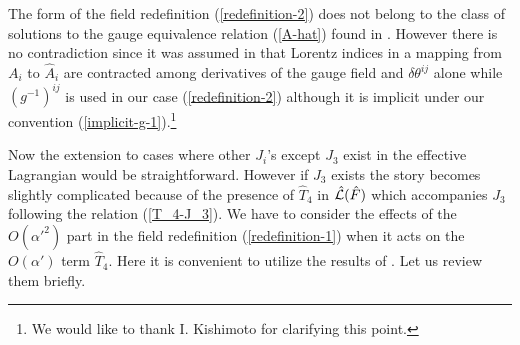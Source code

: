\documentclass[a4paper,12pt]{article}
\begin{document}
The form of the field redefinition (\ref{redefinition-2})
does not belong to the class of solutions
to the gauge equivalence relation
(\ref{A-hat}) found in \cite{AK}.
However there is no contradiction
since it was assumed in \cite{AK} that
Lorentz indices in a mapping from $A_i$ to $\hat{A}_i$
are contracted among derivatives of the gauge field
and $\delta \theta^{ij}$ alone
while $(g^{-1})^{ij}$ is used in our case (\ref{redefinition-2})
although it is implicit
under our convention (\ref{implicit-g-1}).\footnote{
We would like to thank I. Kishimoto for clarifying this point.
}


Now the extension to cases where other $J_i$'s except $J_3$
exist in the effective Lagrangian would be straightforward.
However if $J_3$ exists the story becomes slightly complicated
because of the presence of $\hat{T}_4$ in $\hat{{\cal L}} (\hat{F})$
which accompanies $J_3$ following the relation (\ref{T_4-J_3}).
We have to consider the effects of the $O(\alpha'^2)$ part
in the field redefinition (\ref{redefinition-1})
when it acts on the $O(\alpha')$ term $\hat{T}_4$.
Here it is convenient to utilize the results of \cite{Okawa}.
Let us review them briefly.
\end{document}
